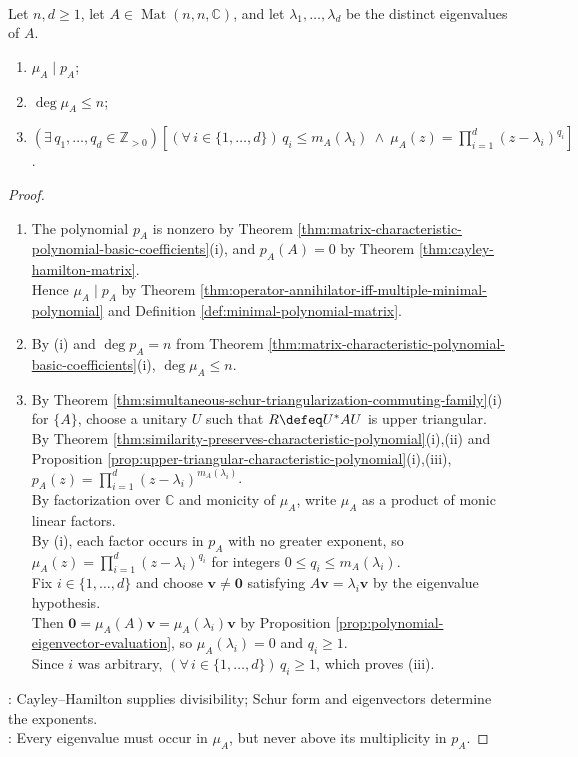 \begin{theorem} \label{thm:minimal-polynomial-basic-properties} \\
Let $n,d\geq1$, let $A\in\operatorname{Mat}(n,n,\mathbb{C})$, and let $\lambda_1,\ldots,\lambda_d$ be the distinct eigenvalues of $A$.
\begin{enumerate}[label=(\roman*)]
\setlength{\itemsep}{0pt}
\item $\mu_A\mid p_A$;
\item $\deg\mu_A\leq n$;
\item $(\exists\,q_1,\ldots,q_d\in\mathbb{Z}_{>0})[(\forall\,i\in\{1,\ldots,d\})\,q_i\leq m_A(\lambda_i)\ \land\ \mu_A(z)=\prod\limits_{i=1}^{d}(z-\lambda_i)^{q_i}]$.
\end{enumerate}
\begin{proof}
\begin{enumerate}[label=(\roman*)]
\setlength{\itemsep}{0pt}
\item The polynomial $p_A$ is nonzero by Theorem \ref{thm:matrix-characteristic-polynomial-basic-coefficients}(i), and $p_A(A)=0$ by Theorem \ref{thm:cayley-hamilton-matrix}.\\
Hence $\mu_A\mid p_A$ by Theorem \ref{thm:operator-annihilator-iff-multiple-minimal-polynomial} and Definition \ref{def:minimal-polynomial-matrix}.
\item By (i) and $\deg p_A=n$ from Theorem \ref{thm:matrix-characteristic-polynomial-basic-coefficients}(i), $\deg\mu_A\leq n$.
\item By Theorem \ref{thm:simultaneous-schur-triangularization-commuting-family}(i) for $\{A\}$, choose a unitary $U$ such that $R\defeq U^*AU$ is upper triangular.\\
By Theorem \ref{thm:similarity-preserves-characteristic-polynomial}(i),(ii) and Proposition \ref{prop:upper-triangular-characteristic-polynomial}(i),(iii), $p_A(z)=\prod\limits_{i=1}^{d}(z-\lambda_i)^{m_A(\lambda_i)}$.\\
By factorization over $\mathbb{C}$ and monicity of $\mu_A$, write $\mu_A$ as a product of monic linear factors.\\
By (i), each factor occurs in $p_A$ with no greater exponent, so $\mu_A(z)=\prod\limits_{i=1}^{d}(z-\lambda_i)^{q_i}$ for integers $0\leq q_i\leq m_A(\lambda_i)$.\\
Fix $i\in\{1,\ldots,d\}$ and choose $\mathbf{v}\neq\mathbf{0}$ satisfying $A\mathbf{v}=\lambda_i\mathbf{v}$ by the eigenvalue hypothesis.\\
Then $\mathbf{0}=\mu_A(A)\mathbf{v}=\mu_A(\lambda_i)\mathbf{v}$ by Proposition \ref{prop:polynomial-eigenvector-evaluation}, so $\mu_A(\lambda_i)=0$ and $q_i\geq1$.\\
Since $i$ was arbitrary, $(\forall\,i\in\{1,\ldots,d\})\,q_i\geq1$, which proves (iii).
\end{enumerate}
: Cayley--Hamilton supplies divisibility; Schur form and eigenvectors determine the exponents.\\
: Every eigenvalue must occur in $\mu_A$, but never above its multiplicity in $p_A$.
\end{proof}
\end{theorem}

